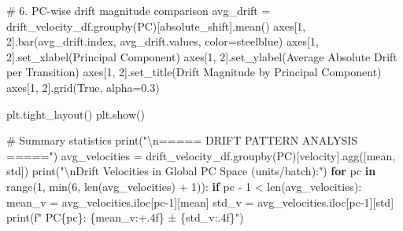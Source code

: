 \documentclass[
  letterpaper,
  DIV=11,
  numbers=noendperiod]{scrartcl}
\newenvironment{Shaded}{\begin{snugshade}}{\end{snugshade}}
\newcommand{\BuiltInTok}[1]{\textcolor[rgb]{0.00,0.23,0.31}{#1}}
\newcommand{\CharTok}[1]{\textcolor[rgb]{0.13,0.47,0.30}{#1}}
\newcommand{\CommentTok}[1]{\textcolor[rgb]{0.37,0.37,0.37}{#1}}
\newcommand{\ControlFlowTok}[1]{\textcolor[rgb]{0.00,0.23,0.31}{\textbf{#1}}}
\newcommand{\DecValTok}[1]{\textcolor[rgb]{0.68,0.00,0.00}{#1}}
\newcommand{\FloatTok}[1]{\textcolor[rgb]{0.68,0.00,0.00}{#1}}
\newcommand{\KeywordTok}[1]{\textcolor[rgb]{0.00,0.23,0.31}{\textbf{#1}}}
\newcommand{\NormalTok}[1]{\textcolor[rgb]{0.00,0.23,0.31}{#1}}
\newcommand{\OperatorTok}[1]{\textcolor[rgb]{0.37,0.37,0.37}{#1}}
\newcommand{\SpecialCharTok}[1]{\textcolor[rgb]{0.37,0.37,0.37}{#1}}
\newcommand{\SpecialStringTok}[1]{\textcolor[rgb]{0.13,0.47,0.30}{#1}}
\newcommand{\StringTok}[1]{\textcolor[rgb]{0.13,0.47,0.30}{#1}}
\newcommand{\VariableTok}[1]{\textcolor[rgb]{0.07,0.07,0.07}{#1}}
\renewenvironment{Shaded}{%
  \begin{tcolorbox}[%
    enhanced,%
    colback=codebg,%
    colframe=codebg,%
    borderline west={3pt}{0pt}{sectionblue},%
    fontupper=\small\ttfamily,%
    boxrule=0pt,%
    arc=0pt,%
    boxsep=5pt,%
    left=2mm,%
    right=2mm,%
    top=2mm,%
    bottom=2mm%
  ]%
}{%
  \end{tcolorbox}%
}
\begin{document}
\begin{Shaded}
\begin{Highlighting}[]
\CommentTok{\# 6. PC{-}wise drift magnitude comparison}
\NormalTok{avg\_drift }\OperatorTok{=}\NormalTok{ drift\_velocity\_df.groupby(}\StringTok{\textquotesingle{}PC\textquotesingle{}}\NormalTok{)[}\StringTok{\textquotesingle{}absolute\_shift\textquotesingle{}}\NormalTok{].mean()}
\NormalTok{axes[}\DecValTok{1}\NormalTok{, }\DecValTok{2}\NormalTok{].bar(avg\_drift.index, avg\_drift.values, color}\OperatorTok{=}\StringTok{\textquotesingle{}steelblue\textquotesingle{}}\NormalTok{)}
\NormalTok{axes[}\DecValTok{1}\NormalTok{, }\DecValTok{2}\NormalTok{].set\_xlabel(}\StringTok{\textquotesingle{}Principal Component\textquotesingle{}}\NormalTok{)}
\NormalTok{axes[}\DecValTok{1}\NormalTok{, }\DecValTok{2}\NormalTok{].set\_ylabel(}\StringTok{\textquotesingle{}Average Absolute Drift per Transition\textquotesingle{}}\NormalTok{)}
\NormalTok{axes[}\DecValTok{1}\NormalTok{, }\DecValTok{2}\NormalTok{].set\_title(}\StringTok{\textquotesingle{}Drift Magnitude by Principal Component\textquotesingle{}}\NormalTok{)}
\NormalTok{axes[}\DecValTok{1}\NormalTok{, }\DecValTok{2}\NormalTok{].grid(}\VariableTok{True}\NormalTok{, alpha}\OperatorTok{=}\FloatTok{0.3}\NormalTok{)}

\NormalTok{plt.tight\_layout()}
\NormalTok{plt.show()}

\CommentTok{\# Summary statistics}
\BuiltInTok{print}\NormalTok{(}\StringTok{"}\CharTok{\textbackslash{}n}\StringTok{===== DRIFT PATTERN ANALYSIS ====="}\NormalTok{)}
\NormalTok{avg\_velocities }\OperatorTok{=}\NormalTok{ drift\_velocity\_df.groupby(}\StringTok{\textquotesingle{}PC\textquotesingle{}}\NormalTok{)[}\StringTok{\textquotesingle{}velocity\textquotesingle{}}\NormalTok{].agg([}\StringTok{\textquotesingle{}mean\textquotesingle{}}\NormalTok{, }\StringTok{\textquotesingle{}std\textquotesingle{}}\NormalTok{])}
\BuiltInTok{print}\NormalTok{(}\StringTok{"}\CharTok{\textbackslash{}n}\StringTok{Drift Velocities in Global PC Space (units/batch):"}\NormalTok{)}
\ControlFlowTok{for}\NormalTok{ pc }\KeywordTok{in} \BuiltInTok{range}\NormalTok{(}\DecValTok{1}\NormalTok{, }\BuiltInTok{min}\NormalTok{(}\DecValTok{6}\NormalTok{, }\BuiltInTok{len}\NormalTok{(avg\_velocities) }\OperatorTok{+} \DecValTok{1}\NormalTok{)):}
    \ControlFlowTok{if}\NormalTok{ pc }\OperatorTok{{-}} \DecValTok{1} \OperatorTok{\textless{}} \BuiltInTok{len}\NormalTok{(avg\_velocities):}
\NormalTok{        mean\_v }\OperatorTok{=}\NormalTok{ avg\_velocities.iloc[pc}\OperatorTok{{-}}\DecValTok{1}\NormalTok{][}\StringTok{\textquotesingle{}mean\textquotesingle{}}\NormalTok{]}
\NormalTok{        std\_v }\OperatorTok{=}\NormalTok{ avg\_velocities.iloc[pc}\OperatorTok{{-}}\DecValTok{1}\NormalTok{][}\StringTok{\textquotesingle{}std\textquotesingle{}}\NormalTok{]}
        \BuiltInTok{print}\NormalTok{(}\SpecialStringTok{f"  PC}\SpecialCharTok{\{}\NormalTok{pc}\SpecialCharTok{\}}\SpecialStringTok{: }\SpecialCharTok{\{}\NormalTok{mean\_v}\SpecialCharTok{:+.4f\}}\SpecialStringTok{ ± }\SpecialCharTok{\{}\NormalTok{std\_v}\SpecialCharTok{:.4f\}}\SpecialStringTok{"}\NormalTok{)}


\end{Highlighting}
\end{Shaded}
\end{document}
